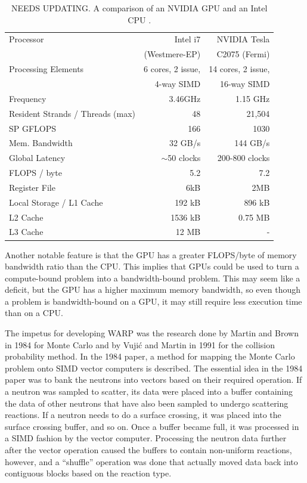 \documentclass[preprint,12pt]{elsarticle}
\begin{document}
\begin{table}[h]
\centering
\caption[A comparison of an NVIDIA GPU and an Intel CPU]{NEEDS UPDATING.  A comparison of an NVIDIA GPU and an Intel CPU \cite{cent, cpu_latency, opteronperformance}.}
\label{gpu_cpu_comp}
\begin{tabular}{| l | r | r |}
\hline
Processor & Intel i7 & NVIDIA Tesla  \\
 &  (Westmere-EP) & C2075 (Fermi) \\
\hline
\hline
Processing Elements & 6 cores, 2 issue, & 14 cores, 2 issue, \\
& 4-way SIMD &  16-way SIMD  \\
\hline
Frequency & 3.46GHz &  1.15 GHz \\
\hline
Resident Strands / Threads (max) & 48 & 21,504 \\
\hline
SP GFLOPS & 166 & 1030 \\
\hline
Mem. Bandwidth &  32 GB/s & 144 GB/s \\
\hline
Global Latency & $\sim$50 clocks & 200-800 clocks  \\
\hline
FLOPS / byte & 5.2  & 7.2 \\
\hline
Register File & 6kB & 2MB \\
\hline
Local Storage / L1 Cache & 192 kB & 896 kB \\
\hline
L2 Cache & 1536 kB & 0.75 MB \\
\hline
L3 Cache & 12 MB & - \\
\hline
\end{tabular}
\end{table}

Another notable feature is that the GPU has a greater FLOPS/byte of memory bandwidth ratio than the CPU.  This implies that GPUs could be used to turn a compute-bound problem into a bandwidth-bound problem.  This may seem like a deficit, but the GPU has a higher maximum memory bandwidth, so even though a problem is bandwidth-bound on a GPU, it may still require less execution time than on a CPU.

The impetus for developing WARP was the research done by Martin and Brown in 1984 \cite{vector} for Monte Carlo and by Vuji\'{c} and Martin in 1991 \cite{vujic_vector} for the collision probability method.  In the 1984 paper, a method for mapping the Monte Carlo problem onto SIMD vector computers is described.  The essential idea in the 1984 paper was to bank the neutrons into vectors based on their required operation.  If a neutron was sampled to scatter, its data were placed into a buffer containing the data of other neutrons that have also been sampled to undergo scattering reactions.  If a neutron needs to do a surface crossing, it was placed into the surface crossing buffer, and so on.  Once a buffer became full, it was processed in a SIMD fashion by the vector computer.  Processing the neutron data further after the vector operation caused the buffers to contain non-uniform reactions, however, and a ``shuffle'' operation was done that actually moved data back into contiguous blocks based on the reaction type.  
\end{document}

